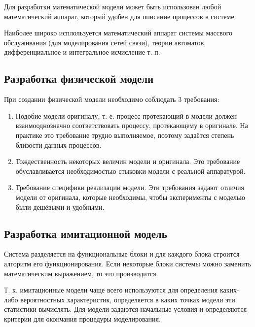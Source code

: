 \documentclass[12pt, russian, oneside, article]{ncc}
\begin{document}
Для разработки математической модели может быть использован любой математический аппарат, который удобен для описание процессов в системе.

Наиболее широко исплользуется математический аппарат системы массвого обслуживания (для моделирования сетей связи), теории автоматов, дифференциальное и интегральное исчисление т. п.
\subsection{Разработка физической модели}
\label{sec-4_5}


При создании физической модели необходимо соблюдать 3 требования:
\begin{enumerate}
\item Подобие модели оригиналу, т. е. процесс протекающий в модели должен взаимооднозначно соответствовать процессу, протекающему в оригинале. На практике это требование трудно выполняемое, поэтому задаётся степень близости данных процессов.
\item Тождественность некоторых величин модели и оригинала. Это требование обуславливается необходимостью стыковки модели с реальной аппаратурой.
\item Требование специфики реализации модели. Эти требования задают отличия модели от оригинала, которые необходимы, чтобы эксперименты с моделью были дешёвыми и удобными.
\end{enumerate}
\subsection{Разработка имитационной модель}
\label{sec-4_6}


Система разделяется на функциональные блоки и для каждого блока строится алгоритм его функционирования. Если некоторые блоки системы можно заменить математическим выражением, то это производится.

Т. к. имитационные модели чаще всего используются для определения каких-либо вероятностных характеристик, определяется в каких точках модели эти статистики вычислять. Для модели задаются начальные условия и определяются критерии для окончания процедуры моделирования.
\end{document}
